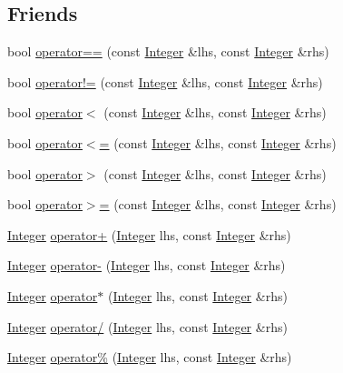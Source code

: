 \subsection*{Friends}
\begin{DoxyCompactItemize}
\item 
bool \hyperlink{classInteger_a01445511d8a430434af376416063d71d}{operator==} (const \hyperlink{classInteger}{Integer} \&lhs, const \hyperlink{classInteger}{Integer} \&rhs)
\item 
bool \hyperlink{classInteger_ad391df8dc93626907e924ff3fd9b1e2d}{operator!=} (const \hyperlink{classInteger}{Integer} \&lhs, const \hyperlink{classInteger}{Integer} \&rhs)
\item 
bool \hyperlink{classInteger_a1205f04dd79ca17ef200a09eb894bab4}{operator$<$} (const \hyperlink{classInteger}{Integer} \&lhs, const \hyperlink{classInteger}{Integer} \&rhs)
\item 
bool \hyperlink{classInteger_a730ae17a06ce6ea59504868598d061dd}{operator$<$=} (const \hyperlink{classInteger}{Integer} \&lhs, const \hyperlink{classInteger}{Integer} \&rhs)
\item 
bool \hyperlink{classInteger_a0007c8d2187897b1e1675677bf432146}{operator$>$} (const \hyperlink{classInteger}{Integer} \&lhs, const \hyperlink{classInteger}{Integer} \&rhs)
\item 
bool \hyperlink{classInteger_afad00c6a35103e4597423c97c25c4ae9}{operator$>$=} (const \hyperlink{classInteger}{Integer} \&lhs, const \hyperlink{classInteger}{Integer} \&rhs)
\item 
\hyperlink{classInteger}{Integer} \hyperlink{classInteger_a8a111f64cebbf58268d9b60f93d5e542}{operator+} (\hyperlink{classInteger}{Integer} lhs, const \hyperlink{classInteger}{Integer} \&rhs)
\item 
\hyperlink{classInteger}{Integer} \hyperlink{classInteger_a42aae7e62188ee2db3daf01b2888a1f2}{operator-\/} (\hyperlink{classInteger}{Integer} lhs, const \hyperlink{classInteger}{Integer} \&rhs)
\item 
\hyperlink{classInteger}{Integer} \hyperlink{classInteger_a48386930c1e622d19df197393f6be01a}{operator$\ast$} (\hyperlink{classInteger}{Integer} lhs, const \hyperlink{classInteger}{Integer} \&rhs)
\item 
\hyperlink{classInteger}{Integer} \hyperlink{classInteger_aeaafaff40a58b3724192ef0e759788b5}{operator/} (\hyperlink{classInteger}{Integer} lhs, const \hyperlink{classInteger}{Integer} \&rhs)
\item 
\hyperlink{classInteger}{Integer} \hyperlink{classInteger_aea18c4ff2ec0c30ed29a4010e892d385}{operator\%} (\hyperlink{classInteger}{Integer} lhs, const \hyperlink{classInteger}{Integer} \&rhs)

\end{DoxyCompactItemize}
